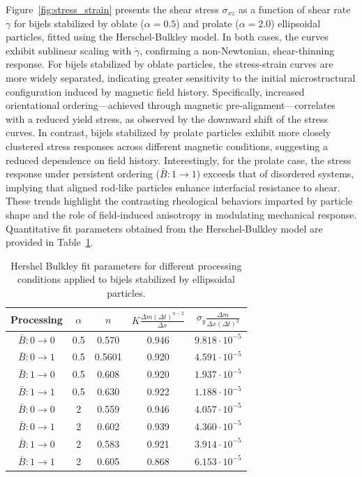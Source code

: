 Figure~\ref{fig:stress_strain} presents the shear stress $\sigma_{xz}$ as a function of shear rate $\dot{\gamma}$ for bijels stabilized by oblate ($\alpha = 0.5$) 
and prolate ($\alpha = 2.0$) ellipsoidal particles, fitted using the Herschel-Bulkley model. In both cases, the curves exhibit sublinear scaling with $\dot{\gamma}$, 
confirming a non-Newtonian, shear-thinning response. For bijels stabilized by oblate particles, the stress-strain curves are more widely separated, indicating 
greater sensitivity to the initial microstructural configuration induced by magnetic field history. Specifically, increased orientational ordering—achieved through 
magnetic pre-alignment—correlates with a reduced yield stress, as observed by the downward shift of the stress curves. In contrast, bijels stabilized by prolate 
particles exhibit more closely clustered stress responses across different magnetic conditions, suggesting a reduced dependence on field history. Interestingly, 
for the prolate case, the stress response under persistent ordering ($\bar{B}:1 \rightarrow 1$) exceeds that of disordered systems, implying that aligned rod-like 
particles enhance interfacial resistance to shear. These trends highlight the contrasting rheological behaviors imparted by particle shape and the role of 
field-induced anisotropy in modulating mechanical response. Quantitative fit parameters obtained from the Herschel-Bulkley model are provided in 
Table~\ref{table:rheology_fit}.

\begin{table}[h!]
    \centering
    \renewcommand{\arraystretch}{1.5}  %
    \begin{tabular}{||c c c c c||} 
     \hline
     Processing & $\alpha$ & $n$ & $K \frac{\Delta m (\Delta t)^{n-2}}{\Delta x} $ & $\sigma_{y} \frac{\Delta m}{\Delta x (\Delta t)^2}$ \\ [0.5ex] 
     \hline\hline
     $\bar{B}: 0 \rightarrow 0$ & 0.5 & 0.570 & 0.946 & $9.818 \cdot 10^{-5}$ \\ 
     \hline
     $\bar{B}: 0 \rightarrow 1$ & 0.5 & 0.5601 & 0.920 & $4.591 \cdot 10^{-5}$ \\
     \hline
     $\bar{B}: 1 \rightarrow 0$ & 0.5 & 0.608 & 0.920 & $1.937 \cdot 10^{-5}$ \\
     \hline
     $\bar{B}: 1 \rightarrow 1$ & 0.5 & 0.630 & 0.922 & $1.188 \cdot 10^{-5}$ \\
     \hline
     $\bar{B}: 0 \rightarrow 0$ & 2 & 0.559 & 0.946 & $4.057 \cdot 10^{-5}$ \\
     \hline
     $\bar{B}: 0 \rightarrow 1$ & 2 & 0.602 & 0.939 & $4.360 \cdot 10^{-5}$ \\
     \hline
     $\bar{B}: 1 \rightarrow 0$ & 2 & 0.583 & 0.921 & $3.914 \cdot 10^{-5}$ \\
     \hline
     $\bar{B}: 1 \rightarrow 1$ & 2 & 0.605 & 0.868 & $6.153 \cdot 10^{-5}$ \\ [1ex] 
     \hline
    \end{tabular}
    \caption{Hershel Bulkley fit parameters for different processing conditions applied to bijels stabilized by ellipsoidal particles.}
    \label{table:rheology_fit}
\end{table}
 
